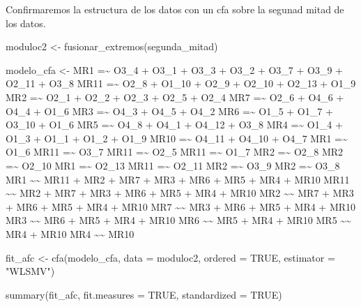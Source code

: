 \documentclass[
  letterpaper,
  DIV=11,
  numbers=noendperiod]{scrartcl}
\newenvironment{Shaded}{\begin{snugshade}}{\end{snugshade}}
\newcommand{\AttributeTok}[1]{\textcolor[rgb]{0.40,0.45,0.13}{#1}}
\newcommand{\ConstantTok}[1]{\textcolor[rgb]{0.56,0.35,0.01}{#1}}
\newcommand{\FunctionTok}[1]{\textcolor[rgb]{0.28,0.35,0.67}{#1}}
\newcommand{\NormalTok}[1]{\textcolor[rgb]{0.00,0.23,0.31}{#1}}
\newcommand{\OtherTok}[1]{\textcolor[rgb]{0.00,0.23,0.31}{#1}}
\newcommand{\StringTok}[1]{\textcolor[rgb]{0.13,0.47,0.30}{#1}}
\begin{document}
Confirmaremos la estructura de los datos con un cfa sobre la segunad
mitad de los datos.

\begin{Shaded}
\begin{Highlighting}[]
\NormalTok{moduloc2 }\OtherTok{\textless{}{-}} \FunctionTok{fusionar\_extremos}\NormalTok{(segunda\_mitad)}

\NormalTok{modelo\_cfa }\OtherTok{\textless{}{-}}\StringTok{\textquotesingle{} }
\StringTok{MR1 =\textasciitilde{} O3\_4 + O3\_1 + O3\_3 + O3\_2 + O3\_7 + O3\_9 + O2\_11 + O3\_8}
\StringTok{MR11 =\textasciitilde{} O2\_8 + O1\_10 + O2\_9 + O2\_10 + O2\_13 + O1\_9}
\StringTok{MR2 =\textasciitilde{} O2\_1 + O2\_2 + O2\_3 + O2\_5 + O2\_4}
\StringTok{MR7 =\textasciitilde{} O2\_6 + O4\_6 + O4\_4 + O1\_6}
\StringTok{MR3 =\textasciitilde{} O4\_3 + O4\_5 + O4\_2}
\StringTok{MR6 =\textasciitilde{} O1\_5 + O1\_7 + O3\_10 + O1\_6}
\StringTok{MR5 =\textasciitilde{} O4\_8 + O4\_1 + O4\_12 + O3\_8}
\StringTok{MR4 =\textasciitilde{} O1\_4 + O1\_3 + O1\_1 + O1\_2 + O1\_9}
\StringTok{MR10 =\textasciitilde{} O4\_11 + O4\_10 + O4\_7}
\StringTok{MR1 =\textasciitilde{} O1\_6}
\StringTok{MR11 =\textasciitilde{} O3\_7}
\StringTok{MR11 =\textasciitilde{} O2\_5}
\StringTok{MR11 =\textasciitilde{} O1\_7}
\StringTok{MR2 =\textasciitilde{} O2\_8}
\StringTok{MR2 =\textasciitilde{} O2\_10}
\StringTok{MR1 =\textasciitilde{} O2\_13}
\StringTok{MR11 =\textasciitilde{} O2\_11}
\StringTok{MR2 =\textasciitilde{} O3\_9}
\StringTok{MR2 =\textasciitilde{} O3\_8}
\StringTok{MR1 \textasciitilde{}\textasciitilde{} MR11 + MR2 + MR7 + MR3 + MR6 + MR5 + MR4 + MR10}
\StringTok{MR11 \textasciitilde{}\textasciitilde{} MR2 + MR7 + MR3 + MR6 + MR5 + MR4 + MR10}
\StringTok{MR2 \textasciitilde{}\textasciitilde{} MR7 + MR3 + MR6 + MR5 + MR4 + MR10}
\StringTok{MR7 \textasciitilde{}\textasciitilde{} MR3 + MR6 + MR5 + MR4 + MR10}
\StringTok{MR3 \textasciitilde{}\textasciitilde{} MR6 + MR5 + MR4 + MR10}
\StringTok{MR6 \textasciitilde{}\textasciitilde{} MR5 + MR4 + MR10}
\StringTok{MR5 \textasciitilde{}\textasciitilde{} MR4 + MR10}
\StringTok{MR4 \textasciitilde{}\textasciitilde{} MR10\textquotesingle{}}


\NormalTok{fit\_afc }\OtherTok{\textless{}{-}} \FunctionTok{cfa}\NormalTok{(modelo\_cfa, }
                       \AttributeTok{data =}\NormalTok{ moduloc2,}
                      \AttributeTok{ordered =} \ConstantTok{TRUE}\NormalTok{,}
                       \AttributeTok{estimator =} \StringTok{"WLSMV"}\NormalTok{)}

\FunctionTok{summary}\NormalTok{(fit\_afc, }\AttributeTok{fit.measures =} \ConstantTok{TRUE}\NormalTok{, }\AttributeTok{standardized =} \ConstantTok{TRUE}\NormalTok{)}
\end{Highlighting}
\end{Shaded}
\end{document}
